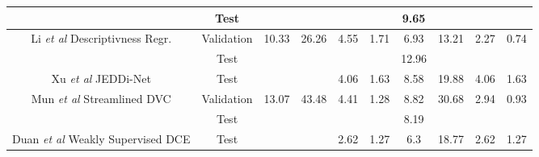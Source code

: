 \begin{table}[]
\begin{tabular}{|c|c|cccc|cccc|}
		& Test                          & \multicolumn{1}{c|}{}           & \multicolumn{1}{c|}{}           & \multicolumn{1}{l|}{}             & \multicolumn{1}{l|}{} & \multicolumn{1}{c|}{9.65}       & \multicolumn{1}{l|}{}           & \multicolumn{1}{c|}{}             &              \\ \hline
		\multirow{2}{*}{Li \textit{et al} \cite{li2018jointly} Descriptivness Regr.} & Validation                    & \multicolumn{1}{c|}{10.33}      & \multicolumn{1}{c|}{26.26}      & \multicolumn{1}{c|}{4.55}         & 1.71                  & \multicolumn{1}{c|}{6.93}       & \multicolumn{1}{c|}{13.21}      & \multicolumn{1}{c|}{2.27}         & 0.74         \\ \cline{2-10} 
		& Test                          & \multicolumn{1}{c|}{}           & \multicolumn{1}{c|}{}           & \multicolumn{1}{l|}{}             & \multicolumn{1}{l|}{} & \multicolumn{1}{c|}{12.96}      & \multicolumn{1}{l|}{}           & \multicolumn{1}{c|}{}             &              \\ \hline
		Xu \textit{et al} \cite{xu2018joint} JEDDi-Net                             & Test                          & \multicolumn{1}{c|}{}           & \multicolumn{1}{c|}{}           & \multicolumn{1}{c|}{4.06}         & 1.63                  & \multicolumn{1}{c|}{8.58}       & \multicolumn{1}{c|}{19.88}      & \multicolumn{1}{c|}{4.06}         & 1.63         \\ \hline
		\multirow{2}{*}{Mun \textit{et al} \cite{mun2019streamlined} Streamlined DVC}     & Validation                    & \multicolumn{1}{c|}{13.07}      & \multicolumn{1}{c|}{43.48}      & \multicolumn{1}{c|}{4.41}         & 1.28                  & \multicolumn{1}{c|}{8.82}       & \multicolumn{1}{c|}{30.68}      & \multicolumn{1}{c|}{2.94}         & 0.93         \\ \cline{2-10} 
		& Test                          & \multicolumn{1}{c|}{}           & \multicolumn{1}{c|}{}           & \multicolumn{1}{l|}{}             & \multicolumn{1}{l|}{} & \multicolumn{1}{c|}{8.19}       & \multicolumn{1}{l|}{}           & \multicolumn{1}{c|}{}             &              \\ \hline
		Duan \textit{et al} \cite{duan2018weakly} Weakly Supervised DCE               & Test                          & \multicolumn{1}{c|}{}           & \multicolumn{1}{c|}{}           & \multicolumn{1}{c|}{2.62}         & 1.27                  & \multicolumn{1}{c|}{6.3}        & \multicolumn{1}{c|}{18.77}      & \multicolumn{1}{c|}{2.62}         & 1.27         \\ \hline

\end{tabular}
\end{table}

